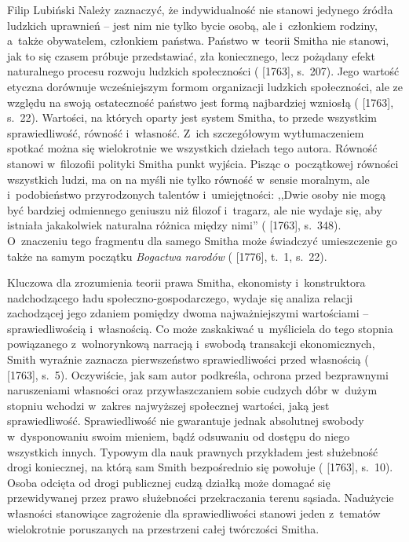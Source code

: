 \begin{artplenv}{Filip Lubiński}
 Należy zaznaczyć, że indywidualność nie stanowi jedynego źródła ludzkich uprawnień -- jest nim nie tylko bycie
osobą, ale i~członkiem rodziny, a~także obywatelem, członkiem państwa. Państwo w~teorii Smitha nie stanowi, jak to się
czasem próbuje przedstawiać, zła koniecznego, lecz pożądany efekt naturalnego procesu rozwoju ludzkich społeczności
(\cite{smith_lectures_1982} [1763], s.~207).
Jego wartość etyczna dorównuje wcześniejszym formom organizacji
ludzkich społeczności, ale ze względu na swoją ostateczność państwo jest formą najbardziej wzniosłą
(\cite{smith_lectures_1982} [1763], s.~22).
Wartości, na których oparty jest system Smitha, to przede
wszystkim sprawiedliwość, równość i~własność. Z~ich szczegółowym wytłumaczeniem spotkać można się wielokrotnie we
wszystkich dziełach tego autora. Równość stanowi w~filozofii polityki Smitha punkt wyjścia. Pisząc o~początkowej
równości wszystkich ludzi, ma on na myśli nie tylko równość w~sensie moralnym, ale i~podobieństwo przyrodzonych
talentów i~umiejętności: ,,Dwie osoby nie mogą być bardziej odmiennego geniuszu niż filozof i~tragarz, ale nie wydaje
się, aby istniała jakakolwiek naturalna różnica między nimi''
(\cite{smith_lectures_1982} [1763], s.~348).
O~znaczeniu tego fragmentu dla samego Smitha może świadczyć umieszczenie go także na samym początku \textit{Bogactwa
narodów}
(\cite{smith_badania_2007} [1776], t.~1, s.~22).

Kluczowa dla zrozumienia teorii prawa Smitha, ekonomisty i~konstruktora nadchodzącego ładu społeczno-gospodarczego,
wydaje się analiza relacji zachodzącej jego zdaniem pomiędzy dwoma najważniejszymi
wartościami -- sprawiedliwością i~własnością. Co może zaskakiwać u~myśliciela do
tego stopnia powiązanego z~wolnorynkową narracją i~swobodą transakcji
ekonomicznych, Smith wyraźnie zaznacza pierwszeństwo sprawiedliwości przed własnością
(\cite{smith_lectures_1982} [1763], s.~5).
Oczywiście, jak sam autor podkreśla, ochrona przed bezprawnymi naruszeniami własności oraz
przywłaszczaniem sobie cudzych dóbr w~dużym stopniu wchodzi w~zakres najwyższej społecznej wartości, jaką jest
sprawiedliwość. Sprawiedliwość nie gwarantuje jednak absolutnej swobody w~dysponowaniu swoim mieniem, bądź odsuwaniu od
dostępu do niego wszystkich innych. Typowym dla nauk prawnych przykładem jest służebność drogi koniecznej, na którą sam
Smith bezpośrednio się powołuje
(\cite{smith_lectures_1982} [1763], s.~10).
Osoba odcięta od drogi publicznej
cudzą działką może domagać się przewidywanej przez prawo służebności przekraczania terenu sąsiada. Nadużycie własności
stanowiące zagrożenie dla sprawiedliwości stanowi jeden z~tematów wielokrotnie poruszanych na przestrzeni całej
twórczości Smitha.


\end{artplenv}
